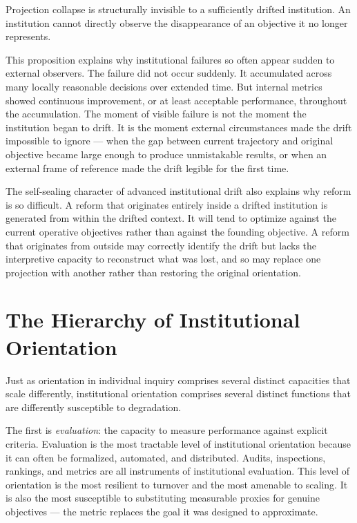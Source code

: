 \begin{principle}
Projection collapse is structurally invisible to a sufficiently drifted
institution. An institution cannot directly observe the disappearance of an
objective it no longer represents.
\end{principle}

This proposition explains why institutional failures so often appear sudden
to external observers. The failure did not occur suddenly. It accumulated
across many locally reasonable decisions over extended time. But internal
metrics showed continuous improvement, or at least acceptable performance,
throughout the accumulation. The moment of visible failure is not the moment
the institution began to drift. It is the moment external circumstances made
the drift impossible to ignore --- when the gap between current trajectory
and original objective became large enough to produce unmistakable results,
or when an external frame of reference made the drift legible for the first
time.

The self-sealing character of advanced institutional drift also explains
why reform is so difficult. A reform that originates entirely inside a
drifted institution is generated from within the drifted context. It will
tend to optimize against the current operative objectives rather than against
the founding objective. A reform that originates from outside may correctly
identify the drift but lacks the interpretive capacity to reconstruct what
was lost, and so may replace one projection with another rather than
restoring the original orientation.

\section{The Hierarchy of Institutional Orientation}

Just as orientation in individual inquiry comprises several distinct
capacities that scale differently, institutional orientation comprises
several distinct functions that are differently susceptible to degradation.

The first is \emph{evaluation}: the capacity to measure performance against
explicit criteria. Evaluation is the most tractable level of institutional
orientation because it can often be formalized, automated, and distributed.
Audits, inspections, rankings, and metrics are all instruments of institutional
evaluation. This level of orientation is the most resilient to turnover and
the most amenable to scaling. It is also the most susceptible to substituting
measurable proxies for genuine objectives --- the metric replaces the goal
it was designed to approximate.

